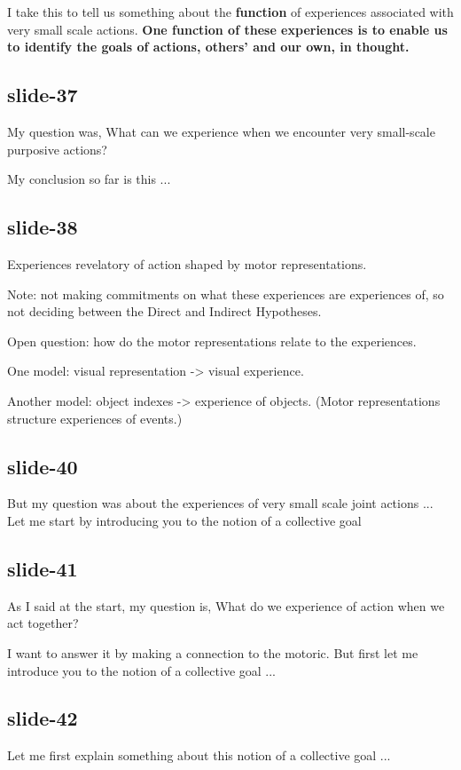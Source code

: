 \documentclass[12pt,\papersize]{extarticle}
\begin{document}
I take this to tell us something about the \textbf{function} of experiences associated with
very small scale actions.
\textbf{One function of these experiences is to enable us to identify the goals of actions, others’
and our own, in thought.}

\subsection{slide-37}
My question was,
What can we experience
when we encounter
very small-scale purposive actions?

My conclusion so far is this ...

\subsection{slide-38}
Experiences revelatory of action
shaped by motor representations.

Note: not making commitments on what these experiences are experiences of,
so not deciding between the Direct and Indirect Hypotheses.

Open question: how do the motor representations relate to the experiences.

One model: visual representation -> visual experience.

Another model: object indexes -> experience of objects.
(Motor representations structure experiences of events.)

\subsection{slide-40}
But my question was about the experiences of very small scale joint actions ...
Let me start by introducing you to the notion of a collective goal

\subsection{slide-41}
As I said at the start, my question is,
What do we experience of action when we act together?

I want to answer it by making a connection to the motoric.
But first let me introduce you to the notion of a collective goal ...

\subsection{slide-42}
Let me first explain something about this notion of a collective goal ...
\end{document}
